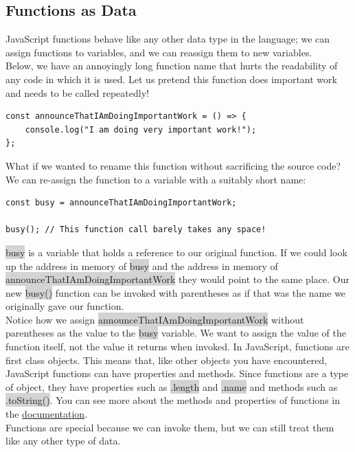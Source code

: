 \documentclass[11pt]{article}
\begin{document}
\subsection{Functions as Data}
JavaScript functions behave like any other data type in the language; we can assign functions to variables, and we can reassign them to new variables. \\
\newline
Below, we have an annoyingly long function name that hurts the readability of any code in which it is used. Let us pretend this function does important work and needs to be called repeatedly!
\begin{lstlisting}
const announceThatIAmDoingImportantWork = () => {
    console.log("I am doing very important work!");
};
\end{lstlisting}
What if we wanted to rename this function without sacrificing the source code? We can re-assign the function to a variable with a suitably short name:
\begin{lstlisting}
const busy = announceThatIAmDoingImportantWork;

busy(); // This function call barely takes any space!
\end{lstlisting}
\colorbox{lightgray}{busy} is a variable that holds a reference to our original function. If we could look up the address in memory of \colorbox{lightgray}{busy} and the address in memory of \colorbox{lightgray}{announceThatIAmDoingImportantWork} they would point to the same place. Our new \colorbox{lightgray}{busy()} function can be invoked with parentheses as if that was the name we originally gave our function. \\
\newline
Notice how we assign \colorbox{lightgray}{announceThatIAmDoingImportantWork} without parentheses as the value to the \colorbox{lightgray}{busy} variable. We want to assign the value of the function itself, not the value it returns when invoked. In JavaScript, functions are first class objects. This means that, like other objects you have encountered, JavaScript functions can have properties and methods. Since functions are a type of object, they have properties such as \colorbox{lightgray}{.length} and \colorbox{lightgray}{.name} and methods such as \colorbox{lightgray}{.toString()}. You can see more about the methods and properties of functions in the \href{https://developer.mozilla.org/en-US/docs/Web/JavaScript/Reference/Global_Objects/Function}{documentation}. \\
\newline
Functions are special because we can invoke them, but we can still treat them like any other type of data. 
\end{document}
